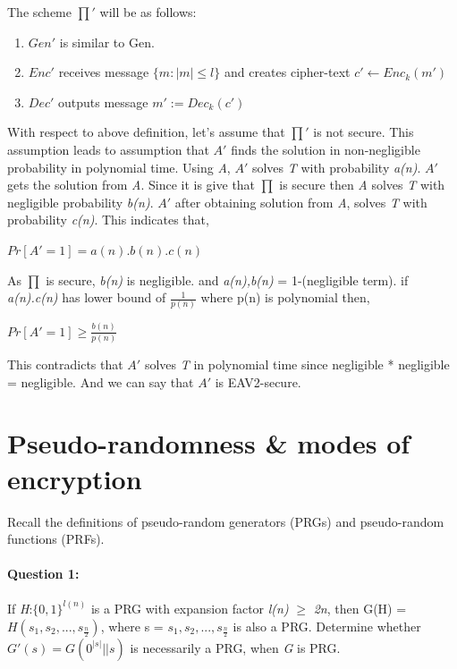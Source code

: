 \documentclass{article}
\begin{document}
        The scheme $\prod\prime$ will be as follows:
        \begin{enumerate}
            \item $Gen\prime$ is similar to Gen.
            \item $Enc\prime$ receives message ${\{m:|m|\leq l\}}$ and creates cipher-text $c\prime \leftarrow{Enc_k{(m\prime)}}$
            \item $Dec\prime$ outputs message $m\prime:=Dec_k{(c\prime)}$
        \end{enumerate}
        With respect to above definition, let's assume that $\prod\prime$ is not secure. This assumption leads to assumption that $A\prime$ finds the solution in non-negligible probability in polynomial time.\newline
        Using \emph{A}, $A\prime$ solves \emph{T} with probability \emph{a(n)}. $A\prime$ gets the solution from \emph{A}. Since it is give that $\prod$ is secure then \emph{A} solves \emph{T} with negligible probability \emph{b(n)}. $A\prime$ after obtaining solution from \emph{A}, solves \emph{T} with probability \emph{c(n)}. \newline
        This indicates that,
        \begin{center}
            $Pr[A\prime = 1] = a(n).b(n).c(n)$
        \end{center}
        As $\prod$ is secure, \emph{b(n)} is negligible. and \emph{a(n),b(n)} = 1-(negligible term). if \emph{a(n).c(n)} has lower bound of $\frac{1}{p(n)}$ where p(n) is polynomial then,
        \begin{center}
            $Pr[A\prime=1] \geq \frac{b(n)}{p(n)}$\newline
        \end{center}
        This contradicts that $A\prime$ solves \emph{T} in polynomial time since negligible * negligible = negligible. And we can say that $A\prime$ is EAV2-secure.
        
    
\section{Pseudo-randomness \& modes of encryption}
    Recall the definitions of pseudo-random generators (PRGs) and pseudo-random functions (PRFs).
    
    \paragraph{Question 1:} If \emph{H}:$\{0,1\}^{l(n)}$ is a PRG with expansion factor \emph{l(n)} $\geq$ \emph{2n}, then G(H) = $H(s_1,s_2,..., s_{\frac{n}{2}})$, where s = $s_1,s_2,..., s_{\frac{n}{2}}$ is also a PRG. Determine whether $G\prime(s)=G(0^{|s|}||s)$ is necessarily a PRG, when \emph{G} is PRG.
    
\end{document}
